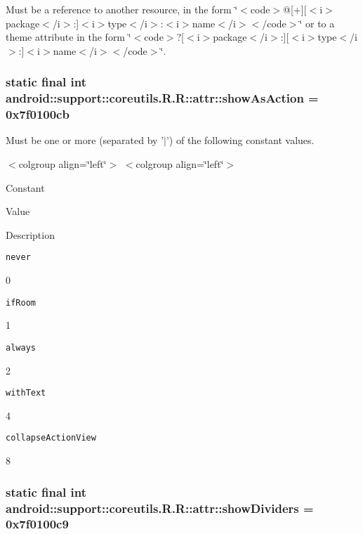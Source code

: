 Must be a reference to another resource, in the form \char`\"{}$<$code$>$@\mbox{[}+\mbox{]}\mbox{[}$<$i$>$package$<$/i$>$:\mbox{]}$<$i$>$type$<$/i$>$:$<$i$>$name$<$/i$>$$<$/code$>$\char`\"{} or to a theme attribute in the form \char`\"{}$<$code$>$?\mbox{[}$<$i$>$package$<$/i$>$:\mbox{]}\mbox{[}$<$i$>$type$<$/i$>$:\mbox{]}$<$i$>$name$<$/i$>$$<$/code$>$\char`\"{}. \hypertarget{classandroid_1_1support_1_1coreutils_1_1_r_1_1attr_3b266cf47708132d77f78aa2a38973a0}{
\subsubsection[{showAsAction}]{\setlength{\rightskip}{0pt plus 5cm}static final int android::support::coreutils.R.R::attr::showAsAction = 0x7f0100cb}}
\label{classandroid_1_1support_1_1coreutils_1_1_r_1_1attr_3b266cf47708132d77f78aa2a38973a0}


Must be one or more (separated by '$|$') of the following constant values. \begin{TabularC}{0}
\hline
\end{TabularC}
$<$colgroup align=\char`\"{}left\char`\"{}$>$ $<$colgroup align=\char`\"{}left\char`\"{}$>$ 

Constant

Value

Description 

{\tt never}

0

{\tt ifRoom}

1

{\tt always}

2

{\tt withText}

4

{\tt collapseActionView}

8\hypertarget{classandroid_1_1support_1_1coreutils_1_1_r_1_1attr_a6a9e189da3cea374ceb924685041299}{
\subsubsection[{showDividers}]{\setlength{\rightskip}{0pt plus 5cm}static final int android::support::coreutils.R.R::attr::showDividers = 0x7f0100c9}}
\label{classandroid_1_1support_1_1coreutils_1_1_r_1_1attr_a6a9e189da3cea374ceb924685041299}


